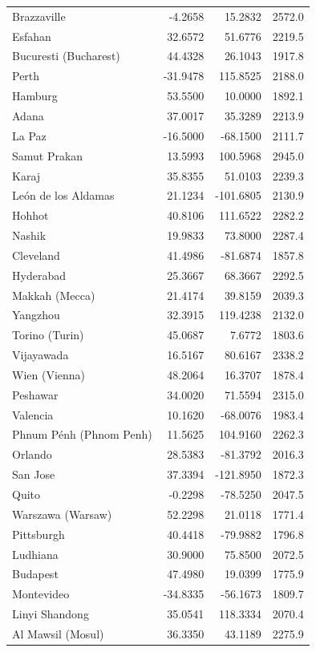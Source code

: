 \begin{longtable}{lrrc}
Brazzaville & -4.2658 & 15.2832 & 2572.0 \\
Esfahan & 32.6572 & 51.6776 & 2219.5 \\
Bucuresti (Bucharest) & 44.4328 & 26.1043 & 1917.8 \\
Perth & -31.9478 & 115.8525 & 2188.0 \\
Hamburg & 53.5500 & 10.0000 & 1892.1 \\
Adana & 37.0017 & 35.3289 & 2213.9 \\
La Paz & -16.5000 & -68.1500 & 2111.7 \\
Samut Prakan & 13.5993 & 100.5968 & 2945.0 \\
Karaj & 35.8355 & 51.0103 & 2239.3 \\
León de los Aldamas & 21.1234 & -101.6805 & 2130.9 \\
Hohhot & 40.8106 & 111.6522 & 2282.2 \\
Nashik & 19.9833 & 73.8000 & 2287.4 \\
Cleveland & 41.4986 & -81.6874 & 1857.8 \\
Hyderabad & 25.3667 & 68.3667 & 2292.5 \\
Makkah (Mecca) & 21.4174 & 39.8159 & 2039.3 \\
Yangzhou & 32.3915 & 119.4238 & 2132.0 \\
Torino (Turin) & 45.0687 & 7.6772 & 1803.6 \\
Vijayawada & 16.5167 & 80.6167 & 2338.2 \\
Wien (Vienna) & 48.2064 & 16.3707 & 1878.4 \\
Peshawar & 34.0020 & 71.5594 & 2315.0 \\
Valencia & 10.1620 & -68.0076 & 1983.4 \\
Phnum Pénh (Phnom Penh) & 11.5625 & 104.9160 & 2262.3 \\
Orlando & 28.5383 & -81.3792 & 2016.3 \\
San Jose & 37.3394 & -121.8950 & 1872.3 \\
Quito & -0.2298 & -78.5250 & 2047.5 \\
Warszawa (Warsaw) & 52.2298 & 21.0118 & 1771.4 \\
Pittsburgh & 40.4418 & -79.9882 & 1796.8 \\
Ludhiana & 30.9000 & 75.8500 & 2072.5 \\
Budapest & 47.4980 & 19.0399 & 1775.9 \\
Montevideo & -34.8335 & -56.1673 & 1809.7 \\
Linyi  Shandong & 35.0541 & 118.3334 & 2070.4 \\
Al Mawsil (Mosul) & 36.3350 & 43.1189 & 2275.9 \\

\end{longtable}
